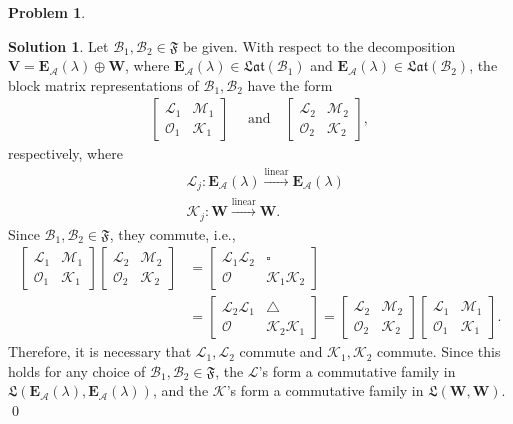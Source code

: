 \documentclass{article}
\theoremstyle{definition}
\newtheorem*{prob*}{Problem}
\newtheorem*{sln*}{Solution}
\newcommand{\V}{\mathbf{V}}
\newcommand{\W}{\mathbf{W}}
\newcommand{\A}{\mathcal{A}}
\newcommand{\B}{\mathcal{B}}
\newcommand{\lag}{\mathcal{L}}
\newcommand{\M}{\mathcal{M}}
\newcommand{\K}{\mathcal{K}}
\newcommand{\lin}{\overset{\text{linear}}{\longrightarrow}}
\newcommand{\FF}{\mathfrak{F}}
\newcommand{\LL}{\mathfrak{L}}
\newcommand{\lat}{\mathfrak{Lat}}
\begin{document}
\begin{prob*}
\begin{sln*}
		Let $\mathcal{B}_1, \B_2 \in \FF$ be given. With respect to the decomposition $\V = \textbf{E}_\A(\lambda) \oplus \W$, where $\textbf{E}_\A(\lambda) \in \lat(\B_1)$ and $\textbf{E}_\A(\lambda) \in \lat(\B_2)$, the block matrix representations of $\B_1, \B_2$ have the form
		\begin{align*}
		\begin{bmatrix}
		\lag_1 & \M_1 \\
		\mathcal{O}_1 & \K_1
		\end{bmatrix}
		\quad \text{ and} \quad
		\begin{bmatrix}
		\lag_2 & \M_2 \\
		\mathcal{O}_2 & \K_2
		\end{bmatrix},
		\end{align*} 
		respectively, where 
		\begin{align*}
		&\lag_j : \textbf{E}_\A(\lambda) \lin \textbf{E}_\A(\lambda)\\
		&\K_j : \W \lin \W.
		\end{align*}
		Since $\mathcal{B}_1, \B_2 \in \FF$, they commute, i.e., 
		\begin{align*}
		\begin{bmatrix}
		\lag_1 & \M_1 \\
		\mathcal{O}_1 & \K_1
		\end{bmatrix}\begin{bmatrix}
		\lag_2 & \M_2 \\
		\mathcal{O}_2 & \K_2
		\end{bmatrix}
		&=
		\begin{bmatrix}
		\lag_1\lag_2 & \square\\
		\mathcal{O} & \K_1\K_2
		\end{bmatrix}\\
		&=
		\begin{bmatrix}
		\lag_2\lag_1 & \triangle\\
		\mathcal{O} & \K_2\K_1
		\end{bmatrix}
		=
		\begin{bmatrix}
		\lag_2 & \M_2 \\
		\mathcal{O}_2 & \K_2
		\end{bmatrix}
		\begin{bmatrix}
		\lag_1 & \M_1 \\
		\mathcal{O}_1 & \K_1
		\end{bmatrix}.
		\end{align*}
		Therefore, it is necessary that $\lag_1, \lag_2$ commute and $\K_1, \K_2$ commute. Since this holds for any choice of $\B_1, \B_2 \in \FF$, the $\lag$'s form a commutative family in $\LL\left(\textbf{E}_\A(\lambda), \textbf{E}_\A(\lambda)\right)$, and the $\K$'s form a commutative family in $\LL\left(\W, \W\right)$. \qed
		
		
	\end{sln*}
	
\end{prob*}
\end{document}
